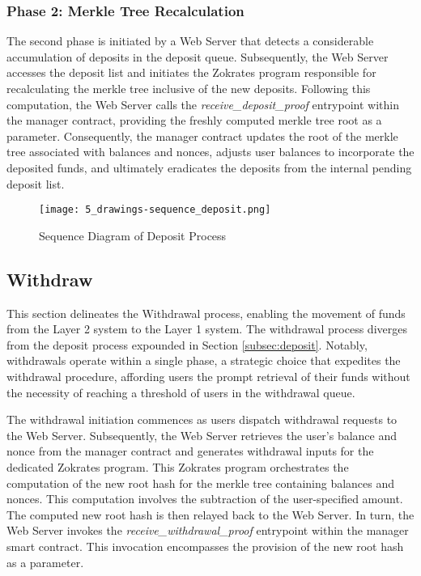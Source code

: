 \subsubsection{Phase 2: Merkle Tree Recalculation}
The second phase is initiated by a Web Server that detects a considerable accumulation of deposits in the deposit queue. Subsequently, the Web Server accesses the deposit list and initiates the Zokrates program responsible for recalculating the merkle tree inclusive of the new deposits. Following this computation, the Web Server calls the \textit{receive\_deposit\_proof} entrypoint within the manager contract, providing the freshly computed merkle tree root as a parameter. Consequently, the manager contract updates the root of the merkle tree associated with balances and nonces, adjusts user balances to incorporate the deposited funds, and ultimately eradicates the deposits from the internal pending deposit list.

\begin{figure}[ht]
	\centering
	\texttt{[image: 5\_drawings-sequence\_deposit.png]}
	\caption[Scaling Solutions]{Sequence Diagram of Deposit Process}  
	\label{fig:5_drawings-sequence_deposit.png}
  \end{figure} 

  \subsection{Withdraw}
  This section delineates the Withdrawal process, enabling the movement of funds from the Layer 2 system to the Layer 1 system. The withdrawal process diverges from the deposit process expounded in Section \ref{subsec:deposit}. Notably, withdrawals operate within a single phase, a strategic choice that expedites the withdrawal procedure, affording users the prompt retrieval of their funds without the necessity of reaching a threshold of users in the withdrawal queue.
  
  The withdrawal initiation commences as users dispatch withdrawal requests to the Web Server. Subsequently, the Web Server retrieves the user's balance and nonce from the manager contract and generates withdrawal inputs for the dedicated Zokrates program. This Zokrates program orchestrates the computation of the new root hash for the merkle tree containing balances and nonces. This computation involves the subtraction of the user-specified amount. The computed new root hash is then relayed back to the Web Server. In turn, the Web Server invokes the \textit{receive\_withdrawal\_proof} entrypoint within the manager smart contract. This invocation encompasses the provision of the new root hash as a parameter.
  
